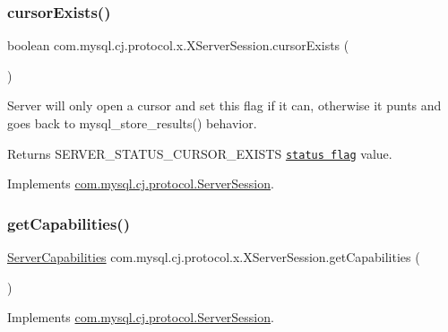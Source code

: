 \subsubsection{\texorpdfstring{cursor\+Exists()}{cursorExists()}}
{\footnotesize\ttfamily boolean com.\+mysql.\+cj.\+protocol.\+x.\+X\+Server\+Session.\+cursor\+Exists (\begin{DoxyParamCaption}{ }\end{DoxyParamCaption})}

Server will only open a cursor and set this flag if it can, otherwise it punts and goes back to mysql\+\_\+store\+\_\+results() behavior.

\begin{DoxyReturn}{Returns}
S\+E\+R\+V\+E\+R\+\_\+\+S\+T\+A\+T\+U\+S\+\_\+\+C\+U\+R\+S\+O\+R\+\_\+\+E\+X\+I\+S\+TS \href{http://dev.mysql.com/doc/internals/en/status-flags.html}{\tt status flag} value. 
\end{DoxyReturn}


Implements \mbox{\hyperlink{interfacecom_1_1mysql_1_1cj_1_1protocol_1_1_server_session_aee37dfcad7c37e0b031da85b7f638435}{com.\+mysql.\+cj.\+protocol.\+Server\+Session}}.

\mbox{\label{classcom_1_1mysql_1_1cj_1_1protocol_1_1x_1_1_x_server_session_a71d555b1492164b97f0efe51c235b674}} 
\subsubsection{\texorpdfstring{get\+Capabilities()}{getCapabilities()}}
{\footnotesize\ttfamily \mbox{\hyperlink{interfacecom_1_1mysql_1_1cj_1_1protocol_1_1_server_capabilities}{Server\+Capabilities}} com.\+mysql.\+cj.\+protocol.\+x.\+X\+Server\+Session.\+get\+Capabilities (\begin{DoxyParamCaption}{ }\end{DoxyParamCaption})}



Implements \mbox{\hyperlink{interfacecom_1_1mysql_1_1cj_1_1protocol_1_1_server_session_a99f2361800e1d3df0a1ab516e4c80737}{com.\+mysql.\+cj.\+protocol.\+Server\+Session}}.

